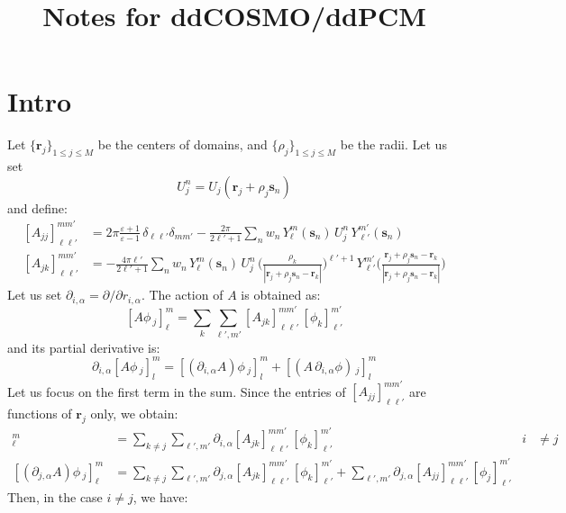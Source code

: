 \documentclass[12pt,letterpaper,oneside]{article}
\title{Notes for ddCOSMO/ddPCM}
\theoremstyle{definition}
\begin{document}
\maketitle

\section{Intro}
Let $\{\boldsymbol{r}_j \}_{1\le j \le M}$ be the centers of domains, and $\{ \rho_j\}_{1\le j \le M}$ be the radii. Let us set
\[
U_j^n = U_j(\boldsymbol{r}_j + \rho_j\boldsymbol{s}_n)
\]
and define:
\begin{align*}
{[A_{jj}]}_{\ell \ell'}^{mm'}& = 2\pi \frac{\varepsilon + 1}{\varepsilon - 1}\, \delta_{\ell \ell'} \delta_{m m'} - \frac{2\pi}{2 \ell' + 1} \sum_n w_n \,Y_\ell^m(\boldsymbol{s}_n) \, U_j^n \, Y_{\ell'}^{m'}(\boldsymbol{s}_n) \\
{[A_{jk}]}_{\ell \ell'}^{mm'}& = -  \frac{4 \pi \ell'}{2 \ell'+1} \sum_n w_n \, Y_\ell^m(\boldsymbol{s}_n) \, U_j^n \, \bigg( \frac{\rho_k}{|\boldsymbol{r}_j + \rho_j \boldsymbol{s}_n - \boldsymbol{r}_k|} \bigg)^{\ell'+1} \, Y_{\ell'}^{m'} \bigg( \frac{\boldsymbol{r}_j + \rho_j \boldsymbol{s}_n - \boldsymbol{r}_k}{|\boldsymbol{r}_j + \rho_j \boldsymbol{s}_n - \boldsymbol{r}_k|} \bigg)
\end{align*}
Let us set $\partial_{i,\alpha} = \partial/\partial r_{i,\alpha}$. The action of $A$ is obtained as:
\[
[A \phi \,_j]_\ell^m = \sum_k \sum_{\ell',m'} [A_{jk}]_{\ell \ell'}^{m m'} \, [\phi_k]_{\ell'}^{m'}
\]
and its partial derivative is:
\[
\partial_{i,\alpha} [A\phi \,_j]_l^m = [ (\partial_{i,\alpha} A) \phi \,_j]_l^m + [ (A \, \partial_{i,\alpha} \phi) \,_j]_l^m
\]
Let us focus on the first term in the sum. Since the entries of ${[A_{jj}]}_{\ell \ell'}^{mm'}$ are functions of $\boldsymbol{r}_j$ only, we obtain:
\begin{align*}
[(\partial_{i,\alpha} A) \phi \,_j]_\ell^m & = \sum_{k\ne j} \sum_{\ell',m'} \partial_{i,\alpha}[A_{jk}]_{\ell \ell'}^{m m'} \, [\phi_k]_{\ell'}^{m'}  & i  &\ne j \\
[(\partial_{j,\alpha} A) \phi \,_j]_\ell^m & = \sum_{k\ne j} \sum_{\ell',m'} \partial_{j,\alpha}[A_{jk}]_{\ell \ell'}^{m m'} \, [\phi_k]_{\ell'}^{m'} + \sum_{\ell',m'} \partial_{j,\alpha} [A_{jj}]_{\ell \ell'}^{m m'} \, [\phi_j]_{\ell'}^{m'} & &
\end{align*}
Then, in the case $i\ne j$, we have:
\end{document}
